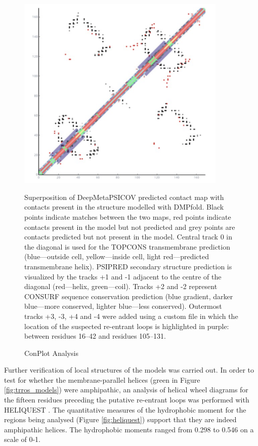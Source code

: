\begin{figure}[th!]
    \centering
    \includegraphics[width=100mm, scale =0.5]{Results/enhanced_c_map2.png}
    \caption{ConPlot Analysis}
    \label{fig:w9_conplot}
    \small
    Superposition of DeepMetaPSICOV predicted contact map with contacts present in the structure modelled with DMPfold. Black points indicate matches between the two maps, red points indicate contacts present in the model but not predicted and grey points are contacts predicted but not present in the model. Central track 0 in the diagonal is used for the TOPCONS transmembrane prediction (blue—outside cell, yellow—inside cell, light red—predicted transmembrane helix). PSIPRED secondary structure prediction is visualized by the tracks +1 and -1 adjacent to the centre of the diagonal (red—helix, green—coil). Tracks +2 and -2 represent CONSURF sequence conservation prediction (blue gradient, darker blue—more conserved, lighter blue—less conserved). Outermost tracks +3, -3, +4 and -4 were added using a custom file in which the location of the suspected re-entrant loops is highlighted in purple: between residues 16–42 and residues 105–131. 
\end{figure}


Further verification of local structures of the models was carried out. In order to test for whether the membrane-parallel helices (green in Figure \ref{fig:trros_models}) were amphipathic, an analysis of helical wheel diagrams for the fifteen residues preceding the putative re-entrant loops was performed with HELIQUEST \cite{Gautier2008}. The quantitative measures of the hydrophobic moment for the regions being analysed (Figure \ref{fig:heliquest}) support that they are indeed amphipathic helices. The hydrophobic moments ranged from 0.298 to 0.546 on a scale of 0-1.

